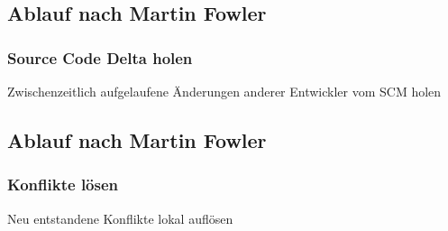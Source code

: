 \documentclass[hyperref={pdfpagelabels=false}]{beamer}
\begin{document}
\subsection{Ablauf nach Martin Fowler}
\begin{frame} [t]
\frametitle{Source Code Delta holen}
\begin{figure}[h]
  \centering
\end{figure}
\vspace{0.5cm} 
Zwischenzeitlich aufgelaufene Änderungen anderer Entwickler vom SCM holen
\end{frame}

\subsection{Ablauf nach Martin Fowler}
\begin{frame} [t]
\frametitle{Konflikte lösen}
\begin{figure}[h]
  \centering
\end{figure}
\vspace{0.5cm} 
Neu entstandene Konflikte lokal auflösen
\end{frame}
\end{document}
